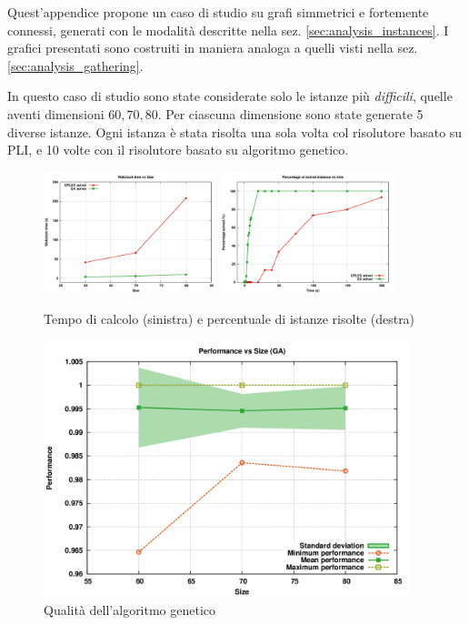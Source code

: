 \documentclass[a4paper, 10pt]{report}
\begin{document}
Quest'appendice propone un caso di studio su grafi simmetrici e fortemente
connessi, generati con le modalità descritte nella sez. \ref{sec:analysis_instances}.
I grafici presentati sono costruiti in maniera analoga a quelli visti nella
sez. \ref{sec:analysis_gathering}.

In questo caso di studio sono state considerate solo le istanze più \emph{difficili},
quelle aventi dimensioni $60, 70, 80$. Per ciascuna dimensione sono state
generate 5 diverse istanze. Ogni istanza è stata risolta una sola volta col
risolutore basato su PLI, e 10 volte con il risolutore basato su algoritmo
genetico.

\begin{figure}
  \centering
  \includegraphics[width=0.45\textwidth]{images/plot-wallclock-appendix}
  \includegraphics[width=0.45\textwidth]{images/plot-cumulative-appendix}
  \caption{Tempo di calcolo (sinistra) e percentuale di istanze risolte (destra)}
  \label{fig:plot-appendix1}
\end{figure}

\begin{figure}
  \centering
  \includegraphics[width=0.95\textwidth]{images/plot-stability-appendix}
  \caption{Qualità dell'algoritmo genetico}
  \label{fig:plot-appendix2}
\end{figure}
\end{document}
